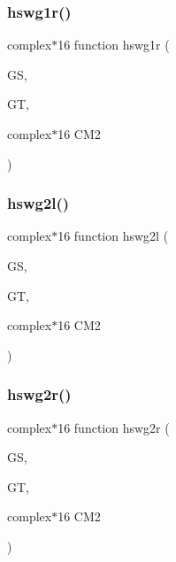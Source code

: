 \subsubsection{\texorpdfstring{hswg1r()}{hswg1r()}}
{\footnotesize\ttfamily complex$\ast$16 function hswg1r (\begin{DoxyParamCaption}\item[{}]{GS,  }\item[{}]{GT,  }\item[{complex$\ast$16}]{C\+M2 }\end{DoxyParamCaption})}

\mbox{\label{djangoh__h_8f_aed3bff6b346cd0f10035f970652aa814}} 
\subsubsection{\texorpdfstring{hswg2l()}{hswg2l()}}
{\footnotesize\ttfamily complex$\ast$16 function hswg2l (\begin{DoxyParamCaption}\item[{}]{GS,  }\item[{}]{GT,  }\item[{complex$\ast$16}]{C\+M2 }\end{DoxyParamCaption})}

\mbox{\label{djangoh__h_8f_af087ee5df2d895e3826c980f55875348}} 
\subsubsection{\texorpdfstring{hswg2r()}{hswg2r()}}
{\footnotesize\ttfamily complex$\ast$16 function hswg2r (\begin{DoxyParamCaption}\item[{}]{GS,  }\item[{}]{GT,  }\item[{complex$\ast$16}]{C\+M2 }\end{DoxyParamCaption})}

\mbox{\label{djangoh__h_8f_adec95817ae41b557fdd99a7dd3d415fb}} 
